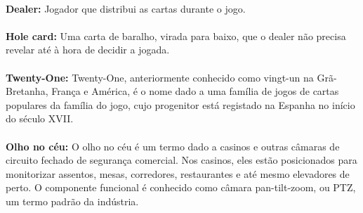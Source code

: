 \documentclass{report}
\begin{document}
\paragraph{}\hypertarget{Glossário}{\textbf{Dealer:} Jogador que distribui as cartas durante o jogo.}
\newline
\paragraph{}\hypertarget{Glossário}{\textbf{Hole card:} Uma carta de baralho, virada para baixo, que o dealer não precisa revelar até à hora de decidir a jogada.}
\newline
\paragraph{}\hypertarget{Glossário}{\textbf{ Twenty-One:} Twenty-One, anteriormente conhecido como vingt-un na Grã-Bretanha, França e América, é o nome dado a uma família de jogos de cartas populares da família do jogo, cujo progenitor está registado na Espanha no início do século XVII.}
\newline
\paragraph{}\hypertarget{Glossário}{\textbf{Olho no céu:} O olho no céu é um termo dado a casinos e outras câmaras de circuito fechado de segurança comercial. Nos casinos, eles estão posicionados para monitorizar assentos, mesas, corredores, restaurantes e até mesmo elevadores de perto. O componente funcional é conhecido como câmara pan-tilt-zoom, ou PTZ, um termo padrão da indústria.}
\newline

\printbibliography
\end{document}
